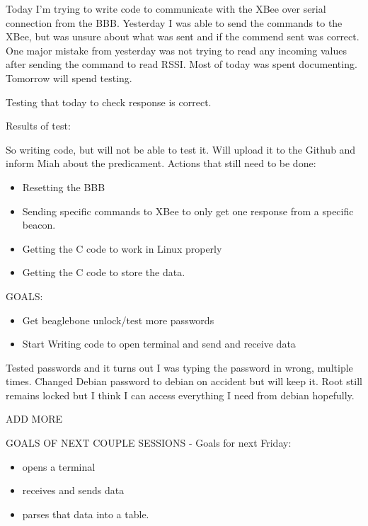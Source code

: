 \documentclass[fontsize=11pt, %
                             paper=letter, %
                             twoside, %
                             captions=tableheading,
                             index=totoc,
                             hyperref]{labbook}
\begin{document}
\begin{addmargin}[0cm]{0cm}
Today I'm trying to write code to communicate with the XBee over serial connection from the BBB. Yesterday I was able to send the commands to the XBee, but was unsure about what was sent and if the commend sent was correct. One major mistake from yesterday was not trying to read any incoming values after sending the command to read RSSI. Most of today was spent documenting. Tomorrow will spend testing.


Testing that today to check response is correct. 

Results of test: 

So writing code, but will not be able to test it. Will upload it to the Github and inform Miah about the predicament. Actions that still need to be done:

\begin{itemize}
\item Resetting the BBB
\item Sending specific commands to XBee to only get one response from a specific beacon. 
\item Getting the C code to work in Linux properly
\item Getting the C code to store the data. 
\end{itemize}

GOALS:
\begin{itemize}
\item Get beaglebone unlock/test more passwords
\item Start Writing code to open terminal and send and receive data
\end{itemize}

Tested passwords and it turns out I was typing the password in wrong, multiple times. Changed Debian password to debian on accident but will keep it. Root still remains locked but I think I can access everything I need from debian hopefully.

ADD MORE

GOALS OF NEXT COUPLE SESSIONS - Goals for next Friday:
\begin{itemize}
\item opens a terminal
\item receives and sends data
\item parses that data into a table. 


\end{itemize}
\end{addmargin}
\end{document}
